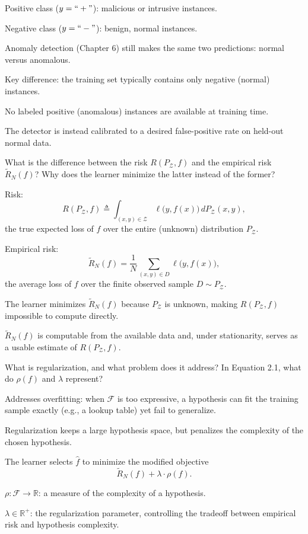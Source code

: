 \documentclass[10pt]{extarticle}
\newcommand{\resposta}[1]{\par\smallskip\noindent #1}
\begin{document}
\begin{questoes}
\resposta{
\begin{topicos}
\item Positive class ($y = ``+"$): malicious or intrusive instances.
\item Negative class ($y = ``-"$): benign, normal instances.
\item Anomaly detection (Chapter 6) still makes the same two predictions: normal versus anomalous.
\item Key difference: the training set typically contains only negative (normal) instances.
\item No labeled positive (anomalous) instances are available at training time.
\item The detector is instead calibrated to a desired false-positive rate on held-out normal data.
\end{topicos}
}

\item What is the difference between the risk $R(P_{\mathcal{Z}}, f)$ and the empirical risk $\tilde{R}_N(f)$? Why does the learner minimize the latter instead of the former?

\resposta{
\begin{topicos}
\item Risk:
\[
R(P_{\mathcal{Z}}, f) \triangleq \int_{(x,y)\in\mathcal{Z}} \ell\big(y, f(x)\big)\, dP_{\mathcal{Z}}(x,y),
\]
the true expected loss of $f$ over the entire (unknown) distribution $P_{\mathcal{Z}}$.
\item Empirical risk:
\[
\tilde{R}_N(f) = \frac{1}{N}\sum_{(x,y)\in D} \ell\big(y, f(x)\big),
\]
the average loss of $f$ over the finite observed sample $D \sim P_{\mathcal{Z}}$.
\item The learner minimizes $\tilde{R}_N(f)$ because $P_{\mathcal{Z}}$ is unknown, making $R(P_{\mathcal{Z}}, f)$ impossible to compute directly.
\item $\tilde{R}_N(f)$ is computable from the available data and, under stationarity, serves as a usable estimate of $R(P_{\mathcal{Z}}, f)$.
\end{topicos}
}

\item What is regularization, and what problem does it address? In Equation 2.1, what do $\rho(f)$ and $\lambda$ represent?

\resposta{
\begin{topicos}
\item Addresses overfitting: when $\mathcal{F}$ is too expressive, a hypothesis can fit the training sample exactly (e.g., a lookup table) yet fail to generalize.
\item Regularization keeps a large hypothesis space, but penalizes the complexity of the chosen hypothesis.
\item The learner selects $\hat{f}$ to minimize the modified objective
\[
\tilde{R}_N(f) + \lambda \cdot \rho(f).
\]
\item $\rho: \mathcal{F} \to \mathbb{R}$: a measure of the complexity of a hypothesis.
\item $\lambda \in \mathbb{R}^{+}$: the regularization parameter, controlling the tradeoff between empirical risk and hypothesis complexity.
\end{topicos}
}


\end{questoes}
\end{document}
